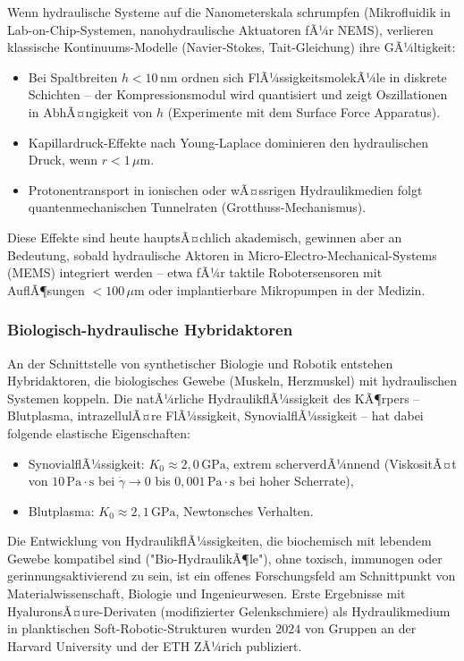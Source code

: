 ﻿\documentclass[a4paper,12pt]{scrreprt}
\theoremstyle{definition}
\begin{document}
Wenn hydraulische Systeme auf die Nanometerskala schrumpfen (Mikro\-fluidik in
Lab-on-Chip-Systemen, nanohydraulische Aktuatoren fÃ¼r NEMS),
verlieren klassische Kontinuums-Modelle (Navier-Stokes, Tait-Gleichung)
ihre GÃ¼ltigkeit:
\begin{itemize}
  \item Bei Spaltbreiten $h < 10\,\mathrm{nm}$ ordnen sich
    FlÃ¼ssigkeitsmolekÃ¼le in diskrete Schichten -- der Kompressionsmodul
    wird quantisiert und zeigt Oszillationen in AbhÃ¤ngigkeit von $h$
    (Experimente mit dem Surface Force Apparatus).
  \item Kapillardruck-Effekte nach Young-Laplace dominieren den
    hydraulischen Druck, wenn $r < 1\,\mu\mathrm{m}$.
  \item Protonentransport in ionischen oder wÃ¤ssrigen
    Hydraulikmedien folgt quantenmechanischen Tunnelraten (Grotthuss-Mechanismus).
\end{itemize}
Diese Effekte sind heute hauptsÃ¤chlich akademisch, gewinnen aber an Bedeutung,
sobald hydraulische Aktoren in Micro-Electro-Mechanical-Systems (MEMS)
integriert werden -- etwa fÃ¼r taktile Robotersensoren mit AuflÃ¶sungen
$< 100\,\mu\mathrm{m}$ oder implantierbare Mikropumpen in der Medizin.

\subsubsection{Biologisch-hydraulische Hybridaktoren}

An der Schnittstelle von synthetischer Biologie und Robotik entstehen
Hybridaktoren, die biologisches Gewebe (Muskeln, Herzmuskel) mit
hydraulischen Systemen koppeln. Die natÃ¼rliche HydraulikflÃ¼ssigkeit
des KÃ¶rpers -- Blutplasma, intrazellulÃ¤re FlÃ¼ssigkeit, SynovialflÃ¼ssigkeit --
hat dabei folgende elastische Eigenschaften:
\begin{itemize}
  \item SynovialflÃ¼ssigkeit: $K_0 \approx 2{,}0\,\mathrm{GPa}$,
    extrem scherverdÃ¼nnend (ViskositÃ¤t von $10\,\mathrm{Pa\cdot s}$ bei
    $\dot\gamma \to 0$ bis $0{,}001\,\mathrm{Pa\cdot s}$ bei hoher Scherrate),
  \item Blutplasma: $K_0 \approx 2{,}1\,\mathrm{GPa}$, Newtonsches Verhalten.
\end{itemize}
Die Entwicklung von HydraulikflÃ¼ssigkeiten, die biochemisch mit lebendem
Gewebe kompatibel sind ("Bio-HydraulikÃ¶le"), ohne toxisch, immuno\-gen
oder gerinnungsaktivierend zu sein, ist ein offenes Forschungsfeld am
Schnittpunkt von Materialwissenschaft, Biologie und Ingenieurwesen.
Erste Ergebnisse mit HyaluronsÃ¤ure-Derivaten (modifizierter Gelenkschmiere)
als Hydraulikmedium in planktischen Soft-Robotic-Strukturen wurden
$2024$ von Gruppen an der Harvard University und der ETH ZÃ¼rich publiziert.
\end{document}
